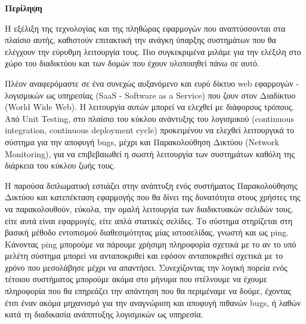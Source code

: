 \begin{center}
  \centering

  \vspace{0.5cm}
  \centering
  \textbf{\Large{Περίληψη}}

  \vspace{1cm}

\end{center}

  Η εξέλιξη της τεχνολογίας και της πληθώρας εφαρμογών που αναπτύσσονται στα πλαίσιο αυτής, καθιστούν επιτακτική την ανάγκη ύπαρξης συστημάτων που θα ελέγχουν την εύρυθμη λειτουργία τους. Πιο συγκεκριμένα μιλάμε για την ελέξιλη στο χώρο του διαδικτύου και των δομών που έχουν υλοποιηθεί πάνω σε αυτό.
  
  Πλέον αναφερόμαστε σε ένα συνεχώς αυξανόμενο και ευρύ δίκτυο web εφαρμογών - λογισμικών ως υπηρεσίας (SaaS - Software as a Service) που ζουν στον Διαδίκτυο (World Wide Web). H λειτουργία αυτών μπορεί να ελεχθεί με διάφορους τρόπους. Από Unit Testing, στο πλαίσιο του κύκλου ανάντυξης του λογισμικού (continuous integration, continuous deployment cycle) προκειμένου να ελεχθεί λειτουργικά το σύστημα για την αποφυγή bugs, μέχρι και Παρακολούθηση Δικτύου (Network Monitoring), για να επιβεβαιωθεί η σωστή λειτουργία των συστημάτων καθόλη της διάρκεια του κύκλου ζωής τους.
  
  Η παρούσα διπλωματική εστιάζει στην ανάπτυξη ενός συστήματος Παρακολούθησης Δικτύου και κατεπέκταση εφαρμογής που θα δίνει της δυνατότητα στους χρήστες της να παρακολουθούν, εύκολα, την ομαλή λειτουργία των διαδικτυακών σελιδών τους, είτε αυτά είναι εφαρμογές, είτε απλά στατικές σελίδες. Το σύστημα στηρίζεται στη βασική μέθοδο εντοπισμού διαθεσιμότητας μίας ιστοσελίδας, γνωστή και ως ping. Κάνοντας ping μπορούμε να πάρουμε χρήσιμη πληροφορία σχετικά με το αν το υπό μελέτη σύστημα μπορεί να ανταποκριθεί και εφόσον ανταποκριθεί σχετικά με το χρόνο που μεσολάβησε μέχρι να απαντήσει. Συνεχίζοντας την λογική πορεία ενός τέτοιου συστήματος μπορούμε ακόμα στο μήνυμα που στέλνουμε να έχουμε πληροφορία που θα επηρεάζει την απάντηση που θα περιμέναμε να δούμε, έχοντας έτσι έναν ακόμα μηχανισμό για την αναγνώριση και αποφυγή πιθανών bugs, ή λαθών κατά τη διαδικασία ανάππτυξης λογισμικών ως υπηρεσία.
